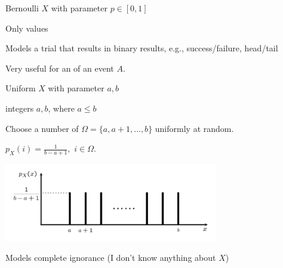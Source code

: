 \documentclass[handout,fleqn,aspectratio=169]{beamer}
\begin{document}
\begin{frame}{Bernoulli $X$ with parameter $p \in [0,1]$}

\plitemsep 0.1in

\bci
\item<1-> Only  values

\item<3-> Models a trial that results in binary results, e.g., success/failure, head/tail

\item<4-> Very useful for an  of an event $A.$ 
\eci 

\end{frame}

\begin{frame}{Uniform $X$ with parameter $a,b$}

\plitemsep 0.1in

\bci 
\item integers $a,b$, where $a \le b$

\item<2-> Choose a number of $\Omega = \{ a, a+1, \ldots, b \}$ uniformly at random. 

\item<3-> $p_X(i) = \frac{1}{b-a+1},$ $i \in \Omega.$


\centering
\includegraphics[width=0.7\textwidth]{L6_uniform_ex.png}

\item<4-> Models complete ignorance (I don't know anything about $X$)

\eci 

\end{frame}
\end{document}
